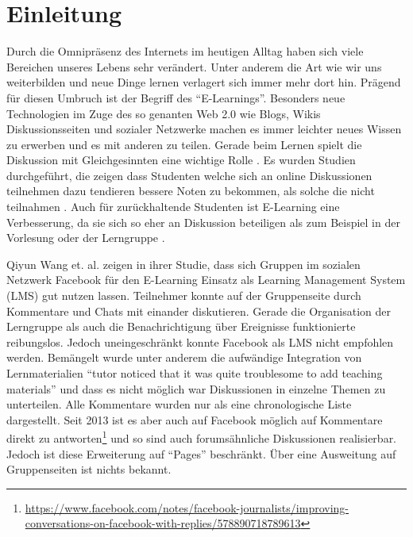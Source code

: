 
\chapter{Einleitung} %
\label{cha:einleitung}





Durch die Omnipräsenz des Internets im heutigen Alltag haben sich viele Bereichen unseres Lebens sehr verändert. Unter anderem die Art wie wir uns weiterbilden und neue Dinge lernen verlagert sich immer mehr dort hin. Prägend für diesen Umbruch ist der Begriff des \enquote{E-Learnings}. Besonders neue Technologien im Zuge des so genanten Web 2.0 wie Blogs, Wikis Diskussionsseiten und sozialer Netzwerke machen es immer leichter neues Wissen zu erwerben und es mit anderen zu teilen. Gerade beim Lernen spielt die Diskussion mit Gleichgesinnten eine wichtige Rolle \cite{Downes2005}. Es wurden Studien durchgeführt, die zeigen dass Studenten welche sich an online Diskussionen teilnehmen dazu tendieren bessere Noten zu bekommen, als solche die nicht teilnahmen \cite{Davies2005,BJET:BJET780}. Auch für zurückhaltende Studenten ist E-Learning eine Verbesserung, da sie sich so eher an Diskussion beteiligen als zum Beispiel in der Vorlesung oder der Lerngruppe \cite{Huang:2009:EPF:1516241.1516267}. 

Qiyun Wang et. al. \cite{Wang2012} zeigen in ihrer Studie, dass sich Gruppen im sozialen Netzwerk Facebook für den E-Learning Einsatz als Learning Management System (LMS) gut nutzen lassen. Teilnehmer konnte auf der Gruppenseite durch Kommentare und Chats mit einander diskutieren. Gerade die Organisation der Lerngruppe als auch die Benachrichtigung über Ereignisse funktionierte reibungslos. Jedoch uneingeschränkt konnte Facebook als LMS nicht empfohlen werden. Bemängelt wurde unter anderem die aufwändige Integration von Lernmaterialien \enquote{tutor noticed that it was quite troublesome to add teaching materials}\cite[S.\,435]{Wang2012} und dass es nicht möglich war Diskussionen in einzelne Themen zu unterteilen. Alle Kommentare wurden nur als eine chronologische Liste dargestellt. Seit 2013 ist es aber auch auf Facebook möglich auf Kommentare direkt zu antworten\footnote{\url{https://www.facebook.com/notes/facebook-journalists/improving-conversations-on-facebook-with-replies/578890718789613}} und so sind auch forumsähnliche Diskussionen realisierbar. Jedoch ist diese Erweiterung auf \enquote{Pages} beschränkt. Über eine Ausweitung auf Gruppenseiten ist nichts bekannt. 

